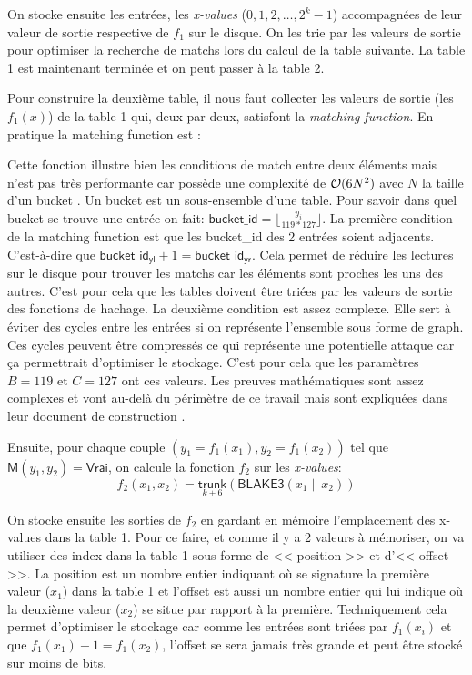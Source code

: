 On stocke ensuite les entrées, les \emph{x-values} ($0,1,2,\dots,2^k-1$) accompagnées de leur valeur de sortie respective de $f_1$ sur le disque. On les trie par les valeurs de sortie pour optimiser la recherche de matchs lors du calcul de la table suivante. La table 1 est maintenant terminée et on peut passer à la table 2.

Pour construire la deuxième table, il nous faut collecter les valeurs de sortie (les $f_1(x)$) de la table 1 qui, deux par deux, satisfont la \emph{matching function}. En pratique la matching function est :


Cette fonction illustre bien les conditions de match entre deux éléments mais n'est pas très performante car possède une complexité de $\mathcal{O}(6N^2)$ avec $N$ la taille d'un bucket \cite{chiapos}. Un bucket est un sous-ensemble d'une table. Pour savoir dans quel bucket se trouve une entrée on fait: $\mathsf{bucket\_id} = \lfloor\frac{y_i}{119 * 127}\rfloor$. La première condition de la matching function est que les bucket\_id des 2 entrées soient adjacents. C'est-à-dire que $\mathsf{bucket\_id_{yl}} + 1 = \mathsf{bucket\_id_{yr}}$. Cela permet de réduire les lectures sur le disque pour trouver les matchs car les éléments sont proches les uns des autres. C'est pour cela que les tables doivent être triées par les valeurs de sortie des fonctions de hachage. La deuxième condition est assez complexe. Elle sert à éviter des cycles entre les entrées si on représente l'ensemble sous forme de graph. Ces cycles peuvent être compressés ce qui représente une potentielle attaque car ça permettrait d'optimiser le stockage. C'est pour cela que les paramètres $B = 119$ et $C = 127$ ont ces valeurs. Les preuves mathématiques sont assez complexes et vont au-delà du périmètre de ce travail mais sont expliquées dans leur document de construction \cite{chia:construction}.

Ensuite, pour chaque couple $(y_1=f_1(x_1), y_2=f_1(x_2))$ tel que $\textsf{M}(y_1, y_2) = \textsf{Vrai}$, on calcule la fonction $f_2$ sur les \emph{x-values}:
\begin{equation*}
  f_2(x_1,x_2) = \underset{k + 6}{\textsf{trunk}}(\textsf{BLAKE3}(x_1\|x_2))
\end{equation*}

On stocke ensuite les sorties de $f_2$ en gardant en mémoire l'emplacement des x-values dans la table 1. Pour ce faire, et comme il y a 2 valeurs à mémoriser, on va utiliser des index dans la table 1 sous forme de << position >> et d'<< offset >>. La position est un nombre entier indiquant où se signature la première valeur ($x_1$) dans la table 1 et l'offset est aussi un nombre entier qui lui indique où la deuxième valeur ($x_2$) se situe par rapport à la première. Techniquement cela permet d'optimiser le stockage car comme les entrées sont triées par $f_1(x_i)$ et que $f_1(x_1) + 1 = f_1(x_2)$, l'offset se sera jamais très grande et peut être stocké sur moins de bits. 

